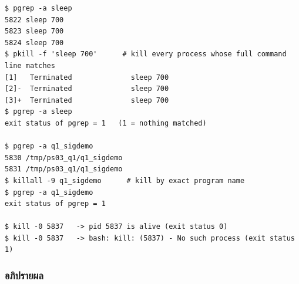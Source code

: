 \documentclass[a4paper,11pt]{article}
\newcommand{\code}[1]{\texttt{#1}}
\begin{document}
\begin{lstlisting}[style=terminal,caption={\code{pgrep} / \code{pkill} / \code{killall} อ้างด้วยชื่อ และ \code{kill -0} ตรวจว่ายังอยู่ไหม}]
$ pgrep -a sleep
5822 sleep 700
5823 sleep 700
5824 sleep 700
$ pkill -f 'sleep 700'      # kill every process whose full command line matches
[1]   Terminated              sleep 700
[2]-  Terminated              sleep 700
[3]+  Terminated              sleep 700
$ pgrep -a sleep
exit status of pgrep = 1   (1 = nothing matched)

$ pgrep -a q1_sigdemo
5830 /tmp/ps03_q1/q1_sigdemo
5831 /tmp/ps03_q1/q1_sigdemo
$ killall -9 q1_sigdemo      # kill by exact program name
$ pgrep -a q1_sigdemo
exit status of pgrep = 1

$ kill -0 5837   -> pid 5837 is alive (exit status 0)
$ kill -0 5837   -> bash: kill: (5837) - No such process (exit status 1)
\end{lstlisting}

\subsubsection{อภิปรายผล}
\end{document}

